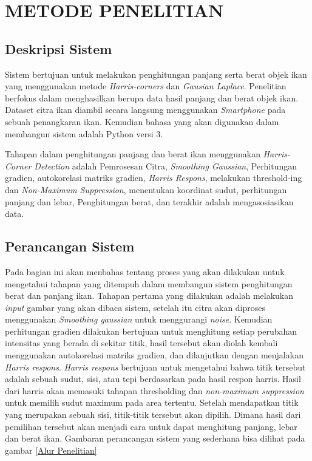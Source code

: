 
\chapter{METODE PENELITIAN}

\section{Deskripsi Sistem}
    Sistem bertujuan untuk melakukan penghitungan panjang serta berat objek ikan yang menggunakan
metode \emph{Harris-corners} dan \emph{Gausian Laplace}. Penelitian berfokus dalam menghasilkan berupa
data hasil panjang dan berat objek ikan. Dataset citra ikan diambil secara langsung menggunakan \emph{Smartphone} pada sebuah
penangkaran ikan. Kemudian bahasa yang akan digunakan dalam membangun sistem adalah Python versi 3.

Tahapan dalam penghitungan panjang dan berat ikan menggunakan \emph{Harris-Corner Detection} adalah Pemrosesan Citra,
\emph{Smoothing Gaussian}, Perhitungan gradien, autokorelasi matriks gradien, \emph{Harris Respons}, melakukan threshold-ing dan \emph{Non-Maximum Suppression}, menentukan koordinat sudut, perhitungan panjang dan lebar, Penghitungan berat,
dan terakhir adalah mengasosiasikan data.

\section{Perancangan Sistem}
    Pada bagian ini akan menbahas tentang proses yang akan dilakukan untuk mengetahui tahapan yang ditempuh
dalam membangun sistem penghitungan berat dan panjang ikan. Tahapan pertama yang dilakukan adalah melakukan \emph{input} gambar
yang akan dibaca sistem, setelah itu citra akan diproses menggunakan \emph{Smoothing gaussian} untuk menggurangi \emph{noise}. Kemudian perhitungan gradien dilakukan bertujuan untuk menghitung setiap perubahan intensitas yang berada di sekitar titik, 
hasil tersebut akan diolah kembali menggunakan autokorelasi matriks gradien, dan dilanjutkan dengan menjalakan \emph{Harris respons}. \emph{Harris respons} bertujuan untuk mengetahui bahwa titik tersebut adalah sebuah sudut, sisi, atau tepi berdasarkan pada hasil respon harris. 
Hasil dari harris akan memasuki tahapan thresholding dan \emph{non-maximum suppression} untuk memilih sudut maximum pada area tertentu. Setelah mendapatkan titik yang merupakan sebuah sisi, titik-titik tersebut akan dipilih. 
Dimana hasil dari pemilihan tersebut akan menjadi cara untuk dapat menghitung panjang, lebar dan berat ikan. Gambaran perancangan sistem yang sederhana bisa dilihat pada gambar \ref*{Alur Penelitian}

